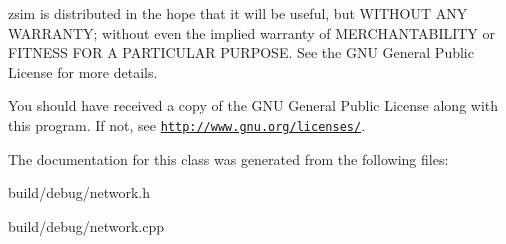 zsim is distributed in the hope that it will be useful, but W\-I\-T\-H\-O\-U\-T A\-N\-Y W\-A\-R\-R\-A\-N\-T\-Y; without even the implied warranty of M\-E\-R\-C\-H\-A\-N\-T\-A\-B\-I\-L\-I\-T\-Y or F\-I\-T\-N\-E\-S\-S F\-O\-R A P\-A\-R\-T\-I\-C\-U\-L\-A\-R P\-U\-R\-P\-O\-S\-E. See the G\-N\-U General Public License for more details.

You should have received a copy of the G\-N\-U General Public License along with this program. If not, see \href{http://www.gnu.org/licenses/}{\tt http\-://www.\-gnu.\-org/licenses/}. 

The documentation for this class was generated from the following files\-:\begin{DoxyCompactItemize}
\item 
build/debug/network.\-h\item 
build/debug/network.\-cpp\end{DoxyCompactItemize}
